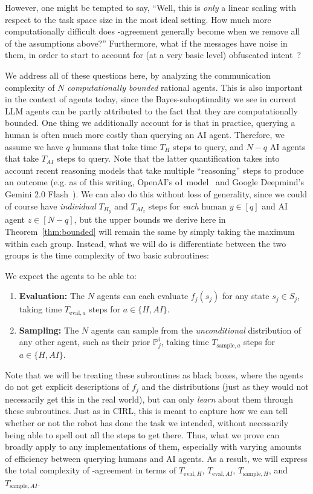 However, one might be tempted to say, ``Well, this is \emph{only} a linear scaling with respect to the task space size in the most ideal setting.
How much more computationally difficult does \agree-agreement generally become when we remove all of the assumptions above?''
Furthermore, what if the messages have noise in them, in order to start to account for (at a very basic level) obfuscated intent~\citep{barnes2020debateobf}?

We address all of these questions here, by analyzing the communication complexity of $N$ \emph{computationally bounded} rational agents.
This is also important in the context of agents today, since the Bayes-suboptimality we see in current LLM agents can be partly attributed to the fact that they are computationally bounded.
One thing we additionally account for is that in practice, querying a human is often much more costly than querying an AI agent.
Therefore, we assume we have $q$ humans that take time $T_H$ steps to query, and $N-q$ AI agents that take $T_{AI}$ steps to query.
Note that the latter quantification takes into account recent reasoning models that take multiple ``reasoning'' steps to produce an outcome (e.g. as of this writing, OpenAI's o1 model~\citep{openai_o1} and Google Deepmind's Gemini 2.0 Flash~\citep{gemini_2_0_flash}).
We can also do this without loss of generality, since we could of course have \emph{individual} $T_{H_y}$ and $T_{{AI}_z}$ steps for \emph{each} human $y \in [q]$ and AI agent $z \in [N-q]$, but the upper bounds we derive here in Theorem~\ref{thm:bounded} will remain the same by simply taking the maximum within each group.
Instead, what we will do is differentiate between the two groups is the time complexity of two basic subroutines:
\begin{requirement}\label{req:bounded-cap}
We expect the agents to be able to:
\begin{enumerate}
\item \textbf{Evaluation:} The $N$ agents can each evaluate $f_j(s_j)$ for any state $s_j \in S_j$, taking time $T_{\text{eval},a}$ steps for $a \in \{H, AI\}$.
\item \textbf{Sampling:} The $N$ agents can sample from the \emph{unconditional} distribution of any other agent, such as their prior $\mathbb{P}_j^i$, taking time $T_{\text{sample},a}$ steps for $a \in \{H, AI\}$.
\end{enumerate}
\end{requirement}
Note that we will be treating these subroutines as black boxes, where the agents do not get explicit descriptions of $f_j$ and the distributions (just as they would not necessarily get this in the real world), but can only \emph{learn} about them through these subroutines.
Just as in CIRL, this is meant to capture how we can tell whether or not the robot has done the task we intended, without necessarily being able to spell out all the steps to get there.
Thus, what we prove can broadly apply to any implementations of them, especially with varying amounts of efficiency between querying humans and AI agents.
As a result, we will express the total complexity of \agree-agreement in terms of $T_{\text{eval},H}$, $T_{\text{eval},AI}$, $T_{\text{sample},H}$, and $T_{\text{sample},AI}$.

